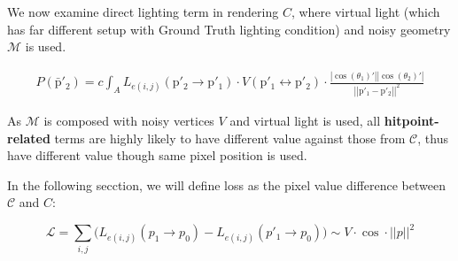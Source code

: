 We now examine direct lighting term in rendering $C$, where virtual light (which has far different setup with Ground Truth lighting condition) and noisy geometry $\mathcal{M}$ is used.



\begin{align}
    \mathit{P}\left(\bar{\mathrm{p}}'_2\right) = c\int_A L_{e(i,j)}(\mathrm{p}'_2\rightarrow \mathrm{p}'_1) \cdot V(\mathrm{p}'_1 \leftrightarrow \mathrm{p}'_2) \cdot \frac{\left|\cos(\theta_1)'\right|\left|\cos(\theta_2)'\right|}{\left|\left|\mathrm{p}'_1-\mathrm{p}'_2\right|\right|^2} \nonumber
    \label{LTE_path_integral_direct_lighting_SLAM}
\end{align}

As $\mathcal{M}$ is composed with noisy vertices $V$ and virtual light is used, all \textbf{hitpoint-related} terms are highly likely to have different value against those from $\mathcal{C}$, thus have different value though same pixel position is used.

In the following secction, we will define loss as the pixel value difference between $\mathcal{C}$ and $C$:

\begin{equation}
    \mathcal{L}=\sum_{i,j} \Big( L_{e(i,j)}(p_1 \rightarrow p_0)-L_{e(i,j)}(p'_1 \rightarrow p_0) \Big) \sim V \cdot \cos \cdot||p||^2
\end{equation}

